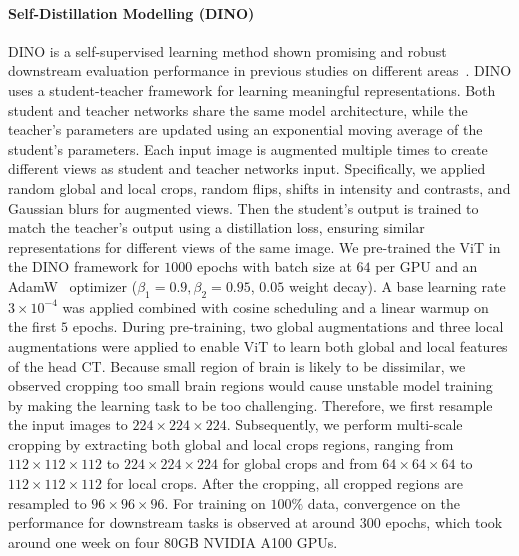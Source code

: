 \documentclass[fleqn,10pt]{wlscirep}
\begin{document}
\paragraph{Self-Distillation Modelling (DINO)}
DINO\cite{caron2021emerging, oquab2023dinov2} is a self-supervised learning method shown promising and robust downstream evaluation performance in previous studies on different areas~\cite{chen_towards_2024, Vorontsov2024}. DINO uses a student-teacher framework for learning meaningful representations. Both student and teacher networks share the same model architecture, while the teacher’s parameters are updated using an exponential moving average of the student’s parameters. Each input image is augmented multiple times to create different views as student and teacher networks input. Specifically, we applied random global and local crops, random flips, shifts in intensity and contrasts, and Gaussian blurs for augmented views. Then the student’s output is trained to match the teacher’s output using a distillation loss, ensuring similar representations for different views of the same image. We pre-trained the ViT in the DINO framework for $1000$ epochs with batch size at $64$ per GPU and an AdamW~\cite{loshchilov2018decoupled} optimizer ($\beta_1=0.9, \beta_2=0.95$, $0.05$ weight decay). A base learning rate $3\times10^{-4}$ was applied combined with cosine scheduling and a linear warmup on the first $5$ epochs. During pre-training, two global augmentations and three local augmentations were applied to enable ViT to learn both global and local features of the head CT. Because small region of brain is likely to be dissimilar, we observed cropping too small brain regions would cause unstable model training by making the learning task to be too challenging. Therefore, we first resample the input images to $224\times224\times224$. Subsequently, we perform multi-scale cropping by extracting both global and local crops regions, ranging from $112\times112\times112$ to $224\times224\times224$ for global crops and from $64\times64\times64$ to $112\times112\times112$ for local crops. After the cropping, all cropped regions are resampled to $96\times96\times96$. For training on $100\%$ data, convergence on the performance for downstream tasks is observed at around $300$ epochs, which took around one week on four 80GB NVIDIA A100 GPUs. 
\end{document}
